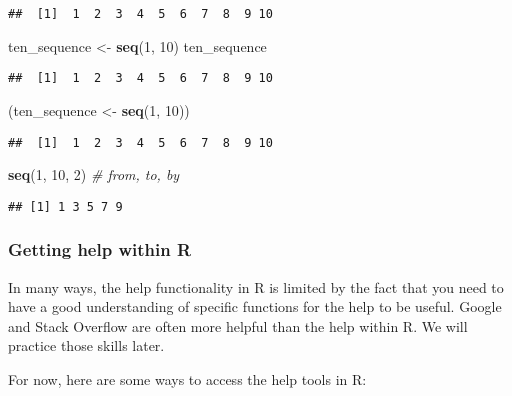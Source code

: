 \documentclass[]{article}
\newenvironment{Shaded}{\begin{snugshade}}{\end{snugshade}}
\newcommand{\KeywordTok}[1]{\textcolor[rgb]{0.13,0.29,0.53}{\textbf{#1}}}
\newcommand{\DecValTok}[1]{\textcolor[rgb]{0.00,0.00,0.81}{#1}}
\newcommand{\StringTok}[1]{\textcolor[rgb]{0.31,0.60,0.02}{#1}}
\newcommand{\CommentTok}[1]{\textcolor[rgb]{0.56,0.35,0.01}{\textit{#1}}}
\newcommand{\NormalTok}[1]{#1}
\begin{document}
\begin{verbatim}
##  [1]  1  2  3  4  5  6  7  8  9 10
\end{verbatim}

\begin{Shaded}
\begin{Highlighting}[]
\NormalTok{ten_sequence <-}\StringTok{ }\KeywordTok{seq}\NormalTok{(}\DecValTok{1}\NormalTok{, }\DecValTok{10}\NormalTok{)}
\NormalTok{ten_sequence}
\end{Highlighting}
\end{Shaded}

\begin{verbatim}
##  [1]  1  2  3  4  5  6  7  8  9 10
\end{verbatim}

\begin{Shaded}
\begin{Highlighting}[]
\NormalTok{(ten_sequence <-}\StringTok{ }\KeywordTok{seq}\NormalTok{(}\DecValTok{1}\NormalTok{, }\DecValTok{10}\NormalTok{))}
\end{Highlighting}
\end{Shaded}

\begin{verbatim}
##  [1]  1  2  3  4  5  6  7  8  9 10
\end{verbatim}

\begin{Shaded}
\begin{Highlighting}[]
\KeywordTok{seq}\NormalTok{(}\DecValTok{1}\NormalTok{, }\DecValTok{10}\NormalTok{, }\DecValTok{2}\NormalTok{) }\CommentTok{# from, to, by}
\end{Highlighting}
\end{Shaded}

\begin{verbatim}
## [1] 1 3 5 7 9
\end{verbatim}

\subsubsection{Getting help within R}\label{getting-help-within-r}

In many ways, the help functionality in R is limited by the fact that
you need to have a good understanding of specific functions for the help
to be useful. Google and Stack Overflow are often more helpful than the
help within R. We will practice those skills later.

For now, here are some ways to access the help tools in R:
\end{document}
